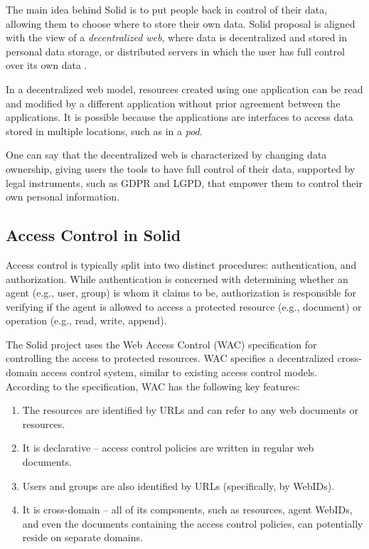 \documentclass[sigconf]{acmart}
\begin{document}
The main idea behind Solid is to put people back in control of their data, allowing them to choose where to store their own data. Solid proposal is aligned with the view of a \textit{decentralized web}, where data is decentralized and stored in personal data storage, or distributed servers in which the user has full control over its own data \cite{verborgh_iswc_2018}.

In a decentralized web model, resources created using one application can be read and modified by a different application without prior agreement between the applications. It is possible because the applications are interfaces to access data stored in multiple locations, such as in a \textit{pod}.

One can say that the decentralized web is characterized by \linebreak changing data ownership, giving users the tools to have full control of their data, supported by legal instruments, such as GDPR and LGPD, that empower them to control their own personal information.

\subsection{Access Control in Solid}

Access control is typically split into two distinct procedures: authentication, and authorization. While authentication is concerned with determining whether an agent (e.g., user, group) is whom it claims to be, authorization is responsible for verifying if the agent is allowed to access a protected resource (e.g., document) or operation (e.g., read, write, append).

The Solid project uses the Web Access Control (WAC) specification for controlling the access to protected resources. WAC specifies a decentralized cross-domain access control system, similar to existing access control models. According to the specification, WAC has the following key features:

\begin{enumerate}
\item The resources are identified by URLs and can refer to any web documents or resources.
\item It is declarative -- access control policies are written in regular web documents.
\item Users and groups are also identified by URLs (specifically, by WebIDs).
\item It is cross-domain -- all of its components, such as resources, agent WebIDs, and even the documents containing the access control policies, can potentially reside on separate domains.
\end{enumerate}
\end{document}
